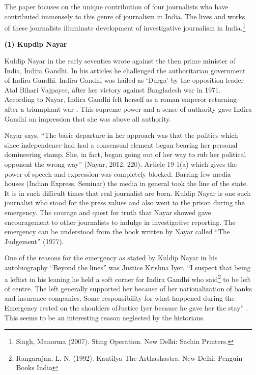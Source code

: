 \begin{multicols}{2}

\noi
The paper focuses on the unique contribution of four journalists who have contributed
immensely to this genre of journalism in India. The lives and works of these journalists
illuminate development of investigative journalism in India.\footnote{Singh, Manorma (2007). Sting Operation. New Delhi: Sachin Printers.}


\noi
{\large \bfseries (1) Kupdip Nayar}


\noi
Kuldip Nayar in the early seventies wrote against the then prime minister of India, Indira
Gandhi. In his articles he challenged the authoritarian government of Indira Gandhi. Indira
Gandhi was hailed as ‘Durga’ by the opposition leader Atal Bihari Vajpayee, after her victory
against Bangladesh war in 1971. According to Nayar, Indira Gandhi felt herself as a roman
emperor returning after a triumphant war . This supreme power and a sense of authority gave
Indira Gandhi an impression that she was above all authority.

\noi
Nayar says, “The basic departure in her approach was that the politics which since
independence had had a consensual element began bearing her personal domineering stamp.
She, in fact, began going out of her way to rub her political opponent the wrong way” (Nayar,
2012, 220). Article 19 1(a) which gives the power of speech and expression was completely
blocked. Barring few media houses (Indian Express, Seminar) the media in general took the
line of the state. It is in such difficult times that real journalist are born. Kuldip Nayar is one
such journalist who stood for the press values and also went to the prison during the emergency.
The courage and quest for truth that Nayar showed gave encouragement to other journalists to
indulge in investigative reporting. The emergency can be understood from the book written by
Nayar called “The Judgement” (1977).

\noi
One of the reasons for the emergency as stated by Kuldip Nayar in his autobiography “Beyond
the lines” was Justice Krishna Iyer. “I suspect that being a leftist in his leaning he held a soft
corner for Indira Gandhi who said\footnote{Rangarajan, L. N. (1992). Kautilya The Arthashastra. New Delhi: Penguin Books India} to be left of centre. The left generally supported her because of her nationalization of banks and insurance companies. Some responsibility for what happened during the Emergency rested on the shoulders ofJustice Iyer because he gave her the stay” . This seems to be an interesting reason neglected by the historians.


\end{multicols}
